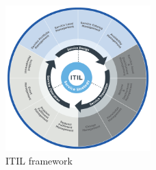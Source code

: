 \begin{figure}[H]
    \centering
    \captionsetup{justification=centering,margin=2cm}
        \includegraphics[width=0.5\textwidth ]{figures/itil.png}
        \caption [ITIL framework]{ ITIL framework \label{fig:myInlineFigure}}
\end{figure}

